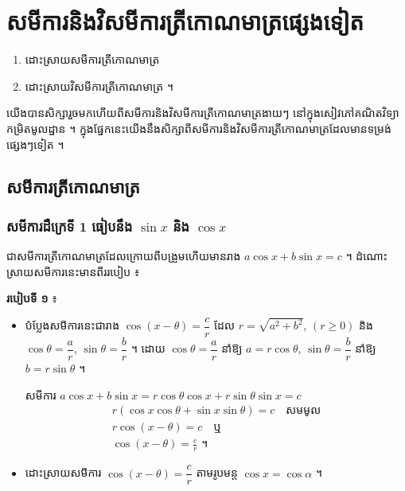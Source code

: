 \chapter{សមីការនិងវិសមីការត្រីកោណមាត្រផ្សេងទៀត}

\begin{objBox}[វត្ថុបំណង]
\begin{enumerate}[1]
  \item ដោះស្រាយសមីការត្រីកោណមាត្រ
  \item ដោះស្រាយវិសមីការត្រីកោណមាត្រ ។
\end{enumerate}
\end{objBox}

យើងបានសិក្សារួចមកហើយពីសមីការនិងវិសមីការត្រីកោណមាត្រងាយៗ នៅក្នុងសៀវភៅគណិតវិទ្យាកម្រិតមូលដ្ឋាន ។ ក្នុងផ្នែកនេះយើងនឹងសិក្សាពីសមីការនិងវិសមីការត្រីកោណមាត្រដែលមានទម្រង់ផ្សេងៗទៀត ។

\section{សមីការត្រីកោណមាត្រ}

\subsection{សមីការដឺក្រេទី 1 ធៀបនឹង \texorpdfstring{$\sin x$}{sin x} និង \texorpdfstring{$\cos x$}{cos x}}

ជាសមីការត្រីកោណមាត្រដែលក្រោយពីបង្រួមហើយមានរាង $a\cos x + b\sin x = c$ ។ ដំណោះស្រាយសមីការនេះមានពីររបៀប ៖

\textbf{របៀបទី ១} ៖
\begin{itemize}
  \item បំប្លែងសមីការនេះជារាង $\cos(x - \theta) = \dfrac{c}{r}$ ដែល $r = \sqrt{a^2 + b^2}$, $(r \ge 0)$ និង $\cos\theta = \dfrac{a}{r}$, $\sin\theta = \dfrac{b}{r}$ ។ ដោយ $\cos\theta = \dfrac{a}{r}$ នាំឱ្យ $a = r\cos\theta$, $\sin\theta = \dfrac{b}{r}$ នាំឱ្យ $b = r\sin\theta$ ។

  សមីការ $a\cos x + b\sin x = r\cos\theta\cos x + r\sin\theta\sin x = c$
  \[
\begin{gathered}
r(\cos x\cos\theta + \sin x\sin\theta) = c \quad \text{សមមូល}\\
r\cos(x - \theta) = c \quad \text{ឬ}\\
\cos(x - \theta) = \frac{c}{r} \text{ ។}
\end{gathered}
\]
  \item ដោះស្រាយសមីការ $\cos(x - \theta) = \dfrac{c}{r}$ តាមរូបមន្ត $\cos x = \cos\alpha$ ។
\end{itemize}

